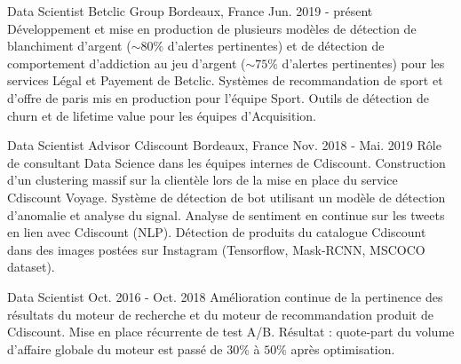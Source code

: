 
\begin{cventries}

  \cventry
    {Data Scientist} %
    {Betclic Group} %
    {Bordeaux, France} %
    {Jun. 2019 - présent} %
    {
    Développement et mise en production de plusieurs modèles de détection de blanchiment d'argent ($\sim80\%$ d'alertes pertinentes) et de détection de comportement d'addiction au jeu d'argent ($\sim75\%$ d'alertes pertinentes) pour les services Légal et Payement de Betclic.\newline
    Systèmes de recommandation de sport et d'offre de paris mis en production pour l'équipe Sport.\newline 
    Outils de détection de churn et de lifetime value pour les équipes d'Acquisition.
    }

  \cventry
    {Data Scientist Advisor} %
    {Cdiscount} %
    {Bordeaux, France} %
    {Nov. 2018 - Mai. 2019} %
    {
    Rôle de consultant Data Science dans les équipes internes de Cdiscount. Construction d'un clustering massif sur la clientèle lors de la mise en place du service Cdiscount Voyage.\newline
    Système de détection de bot utilisant un modèle de détection d'anomalie et analyse du signal.\newline
    Analyse de sentiment en continue sur les tweets en lien avec Cdiscount (NLP).\newline
    Détection de produits du catalogue Cdiscount dans des images postées sur Instagram (Tensorflow, Mask-RCNN, MSCOCO dataset).
    }

  \cventry
    {Data Scientist} %
    {} %
    {} %
    {Oct. 2016 - Oct. 2018} %
    {
    Amélioration continue de la pertinence des résultats du moteur de recherche et du moteur de  recommandation produit de Cdiscount.\newline
    Mise en place récurrente de test A/B.\newline 
    Résultat : quote-part du volume d'affaire globale du moteur est passé de $30\%$ à $50\%$ après optimisation.
    }


\end{cventries}
